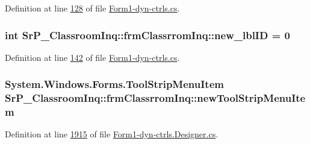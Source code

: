 \-Definition at line \hyperlink{_form1-dyn-ctrls_8cs_source_l00128}{128} of file \hyperlink{_form1-dyn-ctrls_8cs_source}{\-Form1-\/dyn-\/ctrls.\-cs}.

\hypertarget{class_sr_p___classroom_inq_1_1frm_classrrom_inq_a561cfd5c0d34d4adcb14aee4efc01643}{
\subsubsection[{new\-\_\-lbl\-I\-D}]{\setlength{\rightskip}{0pt plus 5cm}int {\bf \-Sr\-P\-\_\-\-Classroom\-Inq\-::frm\-Classrrom\-Inq\-::new\-\_\-lbl\-I\-D} = 0}}
\label{class_sr_p___classroom_inq_1_1frm_classrrom_inq_a561cfd5c0d34d4adcb14aee4efc01643}


\-Definition at line \hyperlink{_form1-dyn-ctrls_8cs_source_l00142}{142} of file \hyperlink{_form1-dyn-ctrls_8cs_source}{\-Form1-\/dyn-\/ctrls.\-cs}.

\hypertarget{class_sr_p___classroom_inq_1_1frm_classrrom_inq_ac3197c0c505ec97395ace77a88a8c068}{
\subsubsection[{new\-Tool\-Strip\-Menu\-Item}]{\setlength{\rightskip}{0pt plus 5cm}\-System.\-Windows.\-Forms.\-Tool\-Strip\-Menu\-Item {\bf \-Sr\-P\-\_\-\-Classroom\-Inq\-::frm\-Classrrom\-Inq\-::new\-Tool\-Strip\-Menu\-Item}}}
\label{class_sr_p___classroom_inq_1_1frm_classrrom_inq_ac3197c0c505ec97395ace77a88a8c068}


\-Definition at line \hyperlink{_form1-dyn-ctrls_8_designer_8cs_source_l01915}{1915} of file \hyperlink{_form1-dyn-ctrls_8_designer_8cs_source}{\-Form1-\/dyn-\/ctrls.\-Designer.\-cs}.

